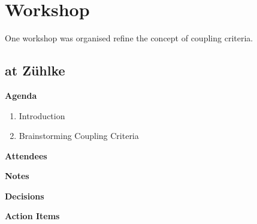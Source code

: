 \section{Workshop}

One workshop was organised refine the concept of coupling criteria.

\subsection{ at Z\"uhlke}

\textbf{Agenda}

\begin{enumerate}
\item Introduction
\item Brainstorming Coupling Criteria
\end{enumerate}

\textbf{Attendees}

\textbf{Notes}

\textbf{Decisions}

\textbf{Action Items}